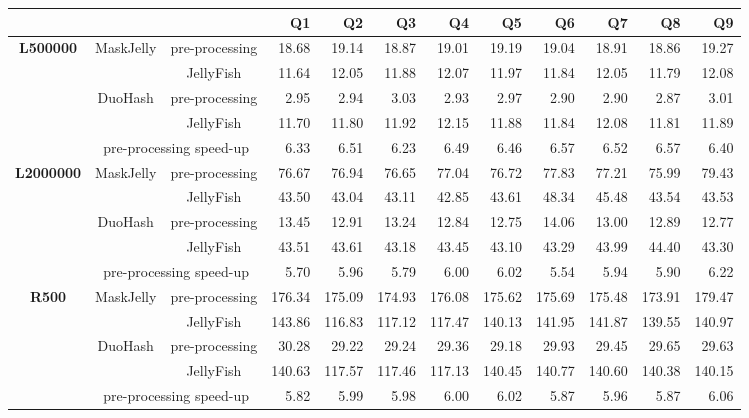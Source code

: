 \begin{sidewaystable}
	\centering
	\begin{tabular}{ccc | rrrrrrrrr}
		& & & \textbf{Q1} & \textbf{Q2} & \textbf{Q3} & \textbf{Q4} & \textbf{Q5} & \textbf{Q6} & \textbf{Q7} & \textbf{Q8} & \textbf{Q9} \\
		\toprule
		\multirow{4}{*}{\textbf{L500000}}
		& \multirow{2}{*}{MaskJelly} & pre-processing & 18.68 & 19.14 & 18.87 & 19.01 & 19.19 & 19.04 & 18.91 & 18.86 & 19.27 \\
		& & JellyFish & 11.64 & 12.05 & 11.88 & 12.07 & 11.97 & 11.84 & 12.05 & 11.79 & 12.08 \\
		\cmidrule{2-12}
		& \multirow{2}{*}{DuoHash} & pre-processing & 2.95 & 2.94 & 3.03 & 2.93 & 2.97 & 2.90 & 2.90 & 2.87 & 3.01 \\
		& & JellyFish & 11.70 & 11.80 & 11.92 & 12.15 & 11.88 & 11.84 & 12.08 & 11.81 & 11.89 \\
		\cmidrule{2-12}
		& \multicolumn{2}{c|}{pre-processing speed-up} & 6.33 & 6.51 & 6.23 & 6.49 & 6.46 & 6.57 & 6.52 & 6.57 & 6.40 \\
		
		\midrule[\heavyrulewidth]
		
		\multirow{4}{*}{\textbf{L2000000}}
		& \multirow{2}{*}{MaskJelly} & pre-processing & 76.67 & 76.94 & 76.65 & 77.04 & 76.72 & 77.83 & 77.21 & 75.99 & 79.43 \\
		& & JellyFish & 43.50 & 43.04 & 43.11 & 42.85 & 43.61 & 48.34 & 45.48 & 43.54 & 43.53 \\
		\cmidrule{2-12}
		& \multirow{2}{*}{DuoHash} & pre-processing & 13.45 & 12.91 & 13.24 & 12.84 & 12.75 & 14.06 & 13.00 & 12.89 & 12.77 \\
		& & JellyFish & 43.51 & 43.61 & 43.18 & 43.45 & 43.10 & 43.29 & 43.99 & 44.40 & 43.30 \\
		\cmidrule{2-12}
		& \multicolumn{2}{c|}{pre-processing speed-up} & 5.70 & 5.96 & 5.79 & 6.00 & 6.02 & 5.54 & 5.94 & 5.90 & 6.22 \\
		
		\midrule[\heavyrulewidth]
		
		\multirow{4}{*}{\textbf{R500}}
		& \multirow{2}{*}{MaskJelly} & pre-processing & 176.34 & 175.09 & 174.93 & 176.08 & 175.62 & 175.69 & 175.48 & 173.91 & 179.47 \\
		& & JellyFish & 143.86 & 116.83 & 117.12 & 117.47 & 140.13 & 141.95 & 141.87 & 139.55 & 140.97 \\
		\cmidrule{2-12}
		& \multirow{2}{*}{DuoHash} & pre-processing & 30.28 & 29.22 & 29.24 & 29.36 & 29.18 & 29.93 & 29.45 & 29.65 & 29.63 \\
		& & JellyFish & 140.63 & 117.57 & 117.46 & 117.13 & 140.45 & 140.77 & 140.60 & 140.38 & 140.15 \\
		\cmidrule{2-12}
		& \multicolumn{2}{c|}{pre-processing speed-up} & 5.82 & 5.99 & 5.98 & 6.00 & 6.02 & 5.87 & 5.96 & 5.87 & 6.06 \\
		

\end{tabular}
\end{sidewaystable}
